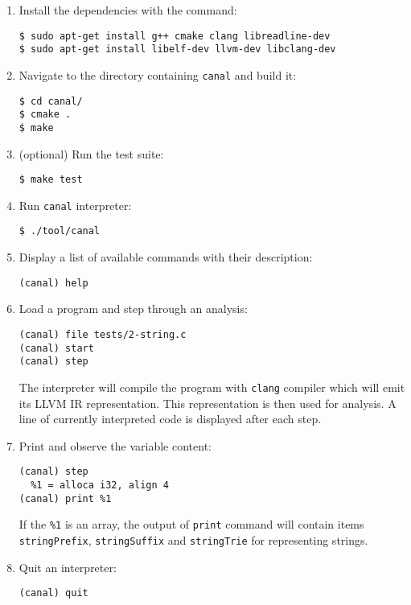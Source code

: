 \documentclass[12pt,final,oneside]{fithesis2}
\theoremstyle{definition}
\begin{document}
\begin{enumerate}
\item Install the dependencies with the command:
\begin{lstlisting}
$ sudo apt-get install g++ cmake clang libreadline-dev
$ sudo apt-get install libelf-dev llvm-dev libclang-dev
\end{lstlisting}

\item Navigate to the directory containing \texttt{canal} and build it:
\begin{lstlisting}
$ cd canal/
$ cmake .
$ make
\end{lstlisting}

\item (optional) Run the test suite:
\begin{lstlisting}
$ make test
\end{lstlisting}

\item Run \texttt{canal} interpreter:
\begin{lstlisting}
$ ./tool/canal
\end{lstlisting}

\item Display a list of available commands with their description:
\begin{lstlisting}
(canal) help
\end{lstlisting}

\item Load a program and step through an analysis:
\begin{lstlisting}
(canal) file tests/2-string.c
(canal) start
(canal) step
\end{lstlisting}

The interpreter will compile the program with \texttt{clang} compiler which
will emit its LLVM IR representation. This representation is then used for
analysis. A line of currently interpreted code is displayed after each step.

\item Print and observe the variable content:
\begin{lstlisting}
(canal) step
  %1 = alloca i32, align 4
(canal) print %1
\end{lstlisting}

If the \texttt{\%1} is an array, the output of \texttt{print} command will
contain items \texttt{stringPrefix}, \texttt{stringSuffix} and
\texttt{stringTrie} for representing strings.

\item Quit an interpreter:
\begin{lstlisting}
(canal) quit
\end{lstlisting}
\end{enumerate}
\end{document}
